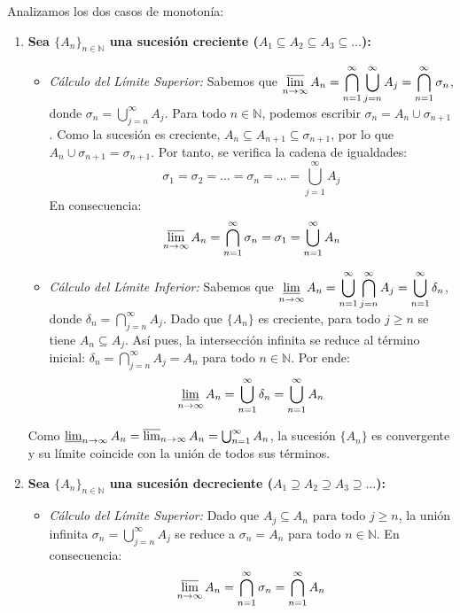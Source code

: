 \begin{demostracion}
Analizamos los dos casos de monotonía:

\begin{enumerate}[label=\alph*)]
    \item \textbf{Sea $\{A_n\}_{n \in \mathbb{N}}$ una sucesión creciente ($A_1 \subseteq A_2 \subseteq A_3 \subseteq \dots$):}
    
    \begin{itemize}
        \item \textit{Cálculo del Límite Superior:} 
        Sabemos que $\displaystyle \varlimsup_{n \to \infty} A_n = \bigcap_{n=1}^\infty \bigcup_{j=n}^\infty A_j = \bigcap_{n=1}^\infty \sigma_n$, donde $\sigma_n = \bigcup_{j=n}^\infty A_j$. 
        Para todo $n \in \mathbb{N}$, podemos escribir $\sigma_n = A_n \cup \sigma_{n+1}$. Como la sucesión es creciente, $A_n \subseteq A_{n+1} \subseteq \sigma_{n+1}$, por lo que $A_n \cup \sigma_{n+1} = \sigma_{n+1}$. 
        Por tanto, se verifica la cadena de igualdades:
        \[
            \sigma_1 = \sigma_2 = \dots = \sigma_n = \dots = \bigcup_{j=1}^\infty A_j
        \]
        En consecuencia:
        \[
            \varlimsup_{n \to \infty} A_n = \bigcap_{n=1}^\infty \sigma_n = \sigma_1 = \bigcup_{n=1}^\infty A_n
        \]

        \item \textit{Cálculo del Límite Inferior:}
        Sabemos que $\displaystyle \varliminf_{n \to \infty} A_n = \bigcup_{n=1}^\infty \bigcap_{j=n}^\infty A_j = \bigcup_{n=1}^\infty \delta_n$, donde $\delta_n = \bigcap_{j=n}^\infty A_j$.
        Dado que $\{A_n\}$ es creciente, para todo $j \ge n$ se tiene $A_n \subseteq A_j$. Así pues, la intersección infinita se reduce al término inicial: $\delta_n = \bigcap_{j=n}^\infty A_j = A_n$ para todo $n \in \mathbb{N}$. 
        Por ende:
        \[
            \varliminf_{n \to \infty} A_n = \bigcup_{n=1}^\infty \delta_n = \bigcup_{n=1}^\infty A_n
        \]
    \end{itemize}
    Como $\varliminf_{n \to \infty} A_n = \varlimsup_{n \to \infty} A_n = \bigcup_{n=1}^\infty A_n$, la sucesión $\{A_n\}$ es convergente y su límite coincide con la unión de todos sus términos.

    \item \textbf{Sea $\{A_n\}_{n \in \mathbb{N}}$ una sucesión decreciente ($A_1 \supseteq A_2 \supseteq A_3 \supseteq \dots$):}
    
    \begin{itemize}
        \item \textit{Cálculo del Límite Superior:}
        Dado que $A_j \subseteq A_n$ para todo $j \ge n$, la unión infinita $\sigma_n = \bigcup_{j=n}^\infty A_j$ se reduce a $\sigma_n = A_n$ para todo $n \in \mathbb{N}$. 
        En consecuencia:
        \[
            \varlimsup_{n \to \infty} A_n = \bigcap_{n=1}^\infty \sigma_n = \bigcap_{n=1}^\infty A_n
        \]


\end{itemize}
\end{enumerate}
\end{demostracion}
